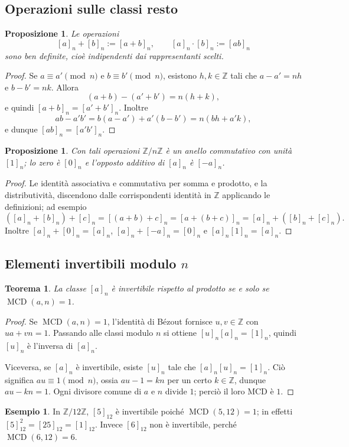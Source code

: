 \documentclass[11pt,a4paper]{article}
\newcommand{\Z}{\mathbb{Z}}
\theoremstyle{definition}
\newtheorem{esempio}[definizione]{Esempio}
\theoremstyle{plain}
\newtheorem{proposizione}[definizione]{Proposizione}
\newtheorem{teorema}[definizione]{Teorema}
\theoremstyle{remark}
\begin{document}
\subsection{Operazioni sulle classi resto}
\begin{proposizione}
Le operazioni
\[
[a]_n+[b]_n:=[a+b]_n,\qquad [a]_n\cdot[b]_n:=[ab]_n
\]
sono ben definite, cioè indipendenti dai rappresentanti scelti.
\end{proposizione}
\begin{proof}
Se $a\equiv a'\pmod n$ e $b\equiv b'\pmod n$, esistono $h,k\in\Z$ tali che $a-a'=nh$ e $b-b'=nk$. Allora
\[
(a+b)-(a'+b')=n(h+k),
\]
e quindi $[a+b]_n=[a'+b']_n$. Inoltre
\[
ab-a'b'=b(a-a')+a'(b-b')=n(bh+a'k),
\]
e dunque $[ab]_n=[a'b']_n$.
\end{proof}
\begin{proposizione}
Con tali operazioni $\Z/n\Z$ è un anello commutativo con unità $[1]_n$; lo zero è $[0]_n$ e l'opposto additivo di $[a]_n$ è $[-a]_n$.
\end{proposizione}
\begin{proof}
Le identità associativa e commutativa per somma e prodotto, e la distributività, discendono dalle corrispondenti identità in $\Z$ applicando le definizioni; ad esempio
\[
([a]_n+[b]_n)+[c]_n=[(a+b)+c]_n=[a+(b+c)]_n=[a]_n+([b]_n+[c]_n).
\]
Inoltre $[a]_n+[0]_n=[a]_n$, $[a]_n+[-a]_n=[0]_n$ e $[a]_n[1]_n=[a]_n$.
\end{proof}

\subsection{Elementi invertibili modulo $n$}
\begin{teorema}
La classe $[a]_n$ è invertibile rispetto al prodotto se e solo se $\operatorname{MCD}(a,n)=1$.
\end{teorema}
\begin{proof}
Se $\operatorname{MCD}(a,n)=1$, l'identità di Bézout fornisce $u,v\in\Z$ con $ua+vn=1$. Passando alle classi modulo $n$ si ottiene $[u]_n[a]_n=[1]_n$, quindi $[u]_n$ è l'inversa di $[a]_n$.

Viceversa, se $[a]_n$ è invertibile, esiste $[u]_n$ tale che $[a]_n[u]_n=[1]_n$. Ciò significa $au\equiv1\pmod n$, ossia $au-1=kn$ per un certo $k\in\Z$, dunque $au-kn=1$. Ogni divisore comune di $a$ e $n$ divide $1$; perciò il loro MCD è $1$.
\end{proof}
\begin{esempio}
In $\Z/12\Z$, $[5]_{12}$ è invertibile poiché $\operatorname{MCD}(5,12)=1$; in effetti $[5]_{12}^2=[25]_{12}=[1]_{12}$. Invece $[6]_{12}$ non è invertibile, perché $\operatorname{MCD}(6,12)=6$.
\end{esempio}
\end{document}
